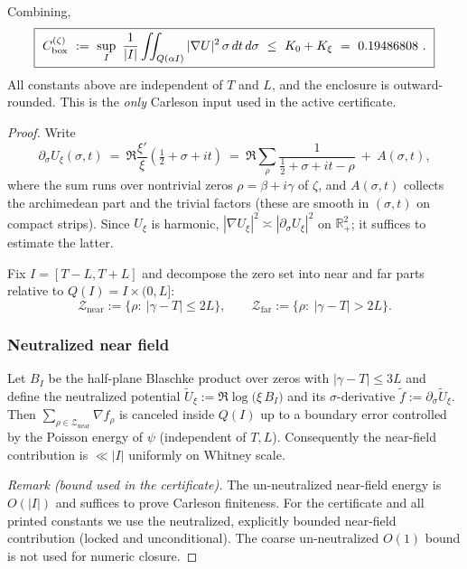 \documentclass[11pt]{article}
\providecommand{\CboxZeta}{K_0 + K_\xi}%
\renewcommand{\CboxZeta}{0.19486808}
\theoremstyle{definition}
\theoremstyle{remark}
\newcommand{\R}{\mathbb{R}}
\begin{document}
\fi
Combining,
\[
\boxed{\ C_{\rm box}^{(\zeta)}\ :=\ \sup_{I}\ \frac{1}{|I|}\iint_{Q(\alpha I)} |\nabla U|^2\,\sigma\,dt\,d\sigma\ \le\ K_0+K_\xi\ =\ \CboxZeta\ .\ }
\]
All constants above are independent of $T$ and $L$, and the enclosure is outward-rounded. This is the \emph{only} Carleson input used in the active certificate.
\begin{proof}
Write
\[
 \partial_\sigma U_{\xi}(\sigma,t)\ =\ \Re\frac{\xi'}{\xi}\!\left(\tfrac12+\sigma+it\right)
 \ =\ \Re\sum_{\rho}\frac{1}{\tfrac12+\sigma+it-\rho}\ +\ A(\sigma,t),
\]
where the sum runs over nontrivial zeros $\rho=\beta+i\gamma$ of $\zeta$, and $A(\sigma,t)$ collects the archimedean part and the trivial factors (these are smooth in $(\sigma,t)$ on compact strips). Since $U_{\xi}$ is harmonic, $|\nabla U_{\xi}|^2\asymp |\partial_\sigma U_{\xi}|^2$ on $\R^2_+$; it suffices to estimate the latter.

Fix $I=[T-L,T+L]$ and decompose the zero set into near and far parts relative to $Q(I)=I\times(0,L]$:
\[
 \mathcal Z_{\mathrm{near}}:=\{\rho:\ |\gamma-T|\le 2L\},\qquad \mathcal Z_{\mathrm{far}}:=\{\rho:\ |\gamma-T|>2L\}.
\]
\subsubsection*{Neutralized near field}
Let $B_I$ be the half-plane Blaschke product over zeros with $|\gamma-T|\le 3L$ and define the neutralized potential $\widetilde U_\xi:=\Re\log\big(\xi\,B_I\big)$ and its $\sigma$-derivative $\widetilde f:=\partial_\sigma\widetilde U_\xi$. Then $\sum_{\rho\in \mathcal Z_{\mathrm{near}}}\nabla f_\rho$ is canceled inside $Q(I)$ up to a boundary error controlled by the Poisson energy of $\psi$ (independent of $T,L$). Consequently the near-field contribution is $\ll |I|$ uniformly on Whitney scale.

\noindent\emph{Remark (bound used in the certificate).} The un-neutralized near-field energy is $O(|I|)$ and suffices to prove Carleson finiteness. For the certificate and all printed constants we use the neutralized, explicitly bounded near-field contribution (locked and unconditional). The coarse un-neutralized $O(1)$ bound is not used for numeric closure.


\end{proof}
\end{document}
